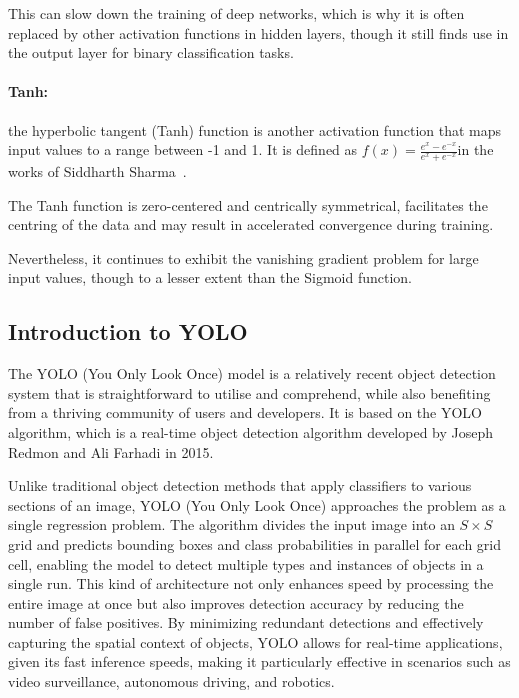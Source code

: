 This can slow down the training of deep networks,
which is why it is often replaced by other activation
functions in hidden layers,
though it still finds use in the output layer for binary classification tasks.



\paragraph{Tanh:}\label{par:tanh}
the hyperbolic tangent (Tanh) function is another activation function that maps input values to a range between -1 and 1.
It is defined as  \( f(x) = \frac{e^x - e^{-x}}{e^x + e^{-x}} \)in the works of Siddharth Sharma~\cite{sharma2017activation}.

The Tanh function is zero-centered and centrically symmetrical, facilitates the centring of the data and may result in accelerated convergence during training.

Nevertheless, it continues to exhibit the vanishing gradient problem for large input values, though to a lesser extent than the Sigmoid function.



\subsection{Introduction to YOLO}\label{subsec:introduction-to-yolo}

The YOLO (You Only Look Once) model is a relatively recent object detection system that is straightforward to utilise and comprehend, while also benefiting from a thriving community of users and developers.
It is based on the YOLO algorithm, which is a real-time object detection algorithm developed by Joseph Redmon and Ali Farhadi in 2015\cite{redmon2016lookonceunifiedrealtime}.



Unlike traditional object detection methods that apply classifiers to various sections of an image,
YOLO (You Only Look Once) approaches the problem as a single regression problem.
The algorithm divides the input image into an
\(S \times S\) grid and predicts bounding boxes and class probabilities in parallel for each grid cell,
enabling the model to detect multiple types and instances of objects in a single run.
This kind of architecture not only enhances speed by processing the entire image at once
but also improves detection accuracy by reducing the number of false positives.
By minimizing redundant detections and effectively capturing the spatial context of objects,
YOLO allows for real-time applications, given its fast inference speeds, making it particularly effective in scenarios such as video surveillance, autonomous driving, and robotics.

